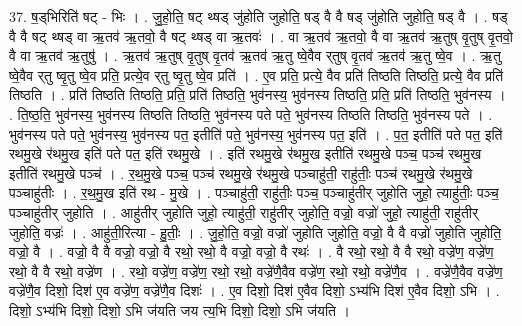 \documentclass[17pt]{extarticle}
\begin{document}
37. ष॒ड्‌भिरिति॑ षट् - भिः । . जु॒हो॒ति॒ षट् थ्षड् जु॑होति जुहोति॒ षड् वै वै षड् जु॑होति जुहोति॒ षड् वै । . षड् वै वै षट् थ्षड् वा ऋ॒तव॑ ऋ॒तवो॒ वै षट् थ्षड् वा ऋ॒तवः॑ । . वा ऋ॒तव॑ ऋ॒तवो॒ वै वा ऋ॒तव॑ ऋ॒तुष् वृ॒तुष् वृ॒तवो॒ वै वा ऋ॒तव॑ ऋ॒तुषु॑ । . ऋ॒तव॑ ऋ॒तुष् वृ॒तुष् वृ॒तव॑ ऋ॒तव॑ ऋ॒तु ष्वे॒वैव र्‌तुष् वृ॒तव॑ ऋ॒तव॑ ऋ॒तु ष्वे॒व । . ऋ॒तु ष्वे॒वैव र्‌तु ष्वृ॒तु ष्वे॒व प्रति॒ प्रत्ये॒व र्‌तु ष्वृ॒तु ष्वे॒व प्रति॑ । . ए॒व प्रति॒ प्रत्ये॒ वैव प्रति॑ तिष्ठति तिष्ठति॒ प्रत्ये॒ वैव प्रति॑ तिष्ठति । . प्रति॑ तिष्ठति तिष्ठति॒ प्रति॒ प्रति॑ तिष्ठति॒ भुव॑नस्य॒ भुव॑नस्य तिष्ठति॒ प्रति॒ प्रति॑ तिष्ठति॒ भुव॑नस्य । . ति॒ष्ठ॒ति॒ भुव॑नस्य॒ भुव॑नस्य तिष्ठति तिष्ठति॒ भुव॑नस्य पते पते॒ भुव॑नस्य तिष्ठति तिष्ठति॒ भुव॑नस्य पते । . भुव॑नस्य पते पते॒ भुव॑नस्य॒ भुव॑नस्य पत॒ इतीति॑ पते॒ भुव॑नस्य॒ भुव॑नस्य पत॒ इति॑ । . प॒त॒ इतीति॑ पते पत॒ इति॑ रथमु॒खे र॑थमु॒ख इति॑ पते पत॒ इति॑ रथमु॒खे । . इति॑ रथमु॒खे र॑थमु॒ख इतीति॑ रथमु॒खे पञ्च॒ पञ्च॑ रथमु॒ख इतीति॑ रथमु॒खे पञ्च॑ । . र॒थ॒मु॒खे पञ्च॒ पञ्च॑ रथमु॒खे र॑थमु॒खे पञ्चाहु॑ती॒ राहु॑तीः॒ पञ्च॑ रथमु॒खे र॑थमु॒खे पञ्चाहु॑तीः । . र॒थ॒मु॒ख इति॑ रथ - मु॒खे । . पञ्चाहु॑ती॒ राहु॑तीः॒ पञ्च॒ पञ्चाहु॑तीर् जुहोति जुहो॒ त्याहु॑तीः॒ पञ्च॒ पञ्चाहु॑तीर् जुहोति । . आहु॑तीर् जुहोति जुहो॒ त्याहु॑ती॒ राहु॑तीर् जुहोति॒ वज्रो॒ वज्रो॑ जुहो॒ त्याहु॑ती॒ राहु॑तीर् जुहोति॒ वज्रः॑ । . आहु॑ती॒रित्या - हु॒तीः॒ । . जु॒हो॒ति॒ वज्रो॒ वज्रो॑ जुहोति जुहोति॒ वज्रो॒ वै वै वज्रो॑ जुहोति जुहोति॒ वज्रो॒ वै । . वज्रो॒ वै वै वज्रो॒ वज्रो॒ वै रथो॒ रथो॒ वै वज्रो॒ वज्रो॒ वै रथः॑ । . वै रथो॒ रथो॒ वै वै रथो॒ वज्रे॑ण॒ वज्रे॑ण॒ रथो॒ वै वै रथो॒ वज्रे॑ण । . रथो॒ वज्रे॑ण॒ वज्रे॑ण॒ रथो॒ रथो॒ वज्रे॑णै॒वैव वज्रे॑ण॒ रथो॒ रथो॒ वज्रे॑णै॒व । . वज्रे॑णै॒वैव वज्रे॑ण॒ वज्रे॑णै॒व दिशो॒ दिश॑ ए॒व वज्रे॑ण॒ वज्रे॑णै॒व दिशः॑ । . ए॒व दिशो॒ दिश॑ ए॒वैव दिशो॒ ऽभ्य॑भि दिश॑ ए॒वैव दिशो॒ ऽभि । . दिशो॒ ऽभ्य॑भि दिशो॒ दिशो॒ ऽभि ज॑यति जय त्य॒भि दिशो॒ दिशो॒ ऽभि ज॑यति । \newline
\pagebreak
{}
\end{document}

